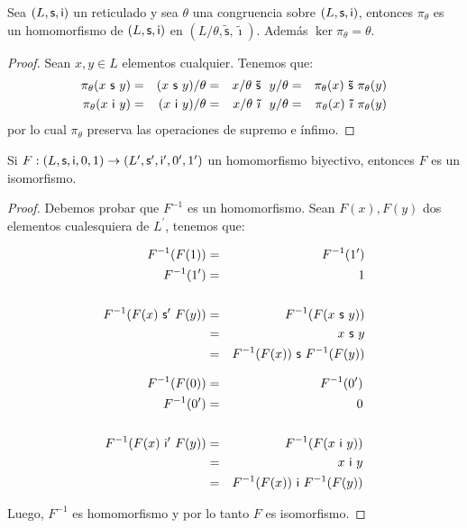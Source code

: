   \begin{lemma}
    \PN Sea $(L, \mathsf{s}, \mathsf{i})$ un reticulado y sea $\theta$ una congruencia sobre $(L, \mathsf{s}, \mathsf{i})$, entonces $\pi_{\theta}$
    es un homomorfismo de $(L, \mathsf{s}, \mathsf{i})$ en $(L/\theta, \mathsf{\tilde{s}}, \mathsf{\tilde{\imath}})$. Además $\ker
    \pi_{\theta} = \theta$.
  \end{lemma}
  \begin{proof}
    \PN Sean $x, y \in L$ elementos cualquier. Tenemos que:
      \begin{alignat*}{4}
        \pi_{\theta}(x \ \SU \ y) &=& (x \ \SU \ y)/\theta &=& x/\theta \ \mathsf{\tilde{s}} \ y/\theta &=&
          \pi_{\theta}(x) \ \mathsf{\tilde{s}} \ \pi_{\theta}(y) \\
        \pi_{\theta}(x \ \IN \ y) &=& (x \ \IN \ y)/\theta &=& x/\theta \ \mathsf{\tilde{\imath}} \ y/\theta &=&
          \pi_{\theta}(x) \ \mathsf{\tilde{\imath}} \ \pi_{\theta}(y) \\
      \end{alignat*}
    \PN por lo cual $\pi_{\theta}$ preserva las operaciones de supremo e ínfimo.
  \end{proof}

  \begin{lemma}
    \PN Si $F: (L, \mathsf{s}, \mathsf{i}, 0, 1) \rightarrow (L^{\prime}, \mathsf{s}^{\prime}, \mathsf{i}^{\prime}, 0^{\prime}, 1^{\prime})$ un
    homomorfismo biyectivo, entonces $F$ es un isomorfismo.
  \end{lemma}
  \begin{proof}
      \PN Debemos probar que $F^{-1}$ es un homomorfismo. Sean $F(x), F(y)$ dos elementos cualesquiera de $L^{\prime}$,
      tenemos que:
      \begin{multicols}{2}
        \begin{eqnarray*}
          F^{-1}(F(1)) &=& F^{-1}(1^{\prime}) \\
          F^{-1}(1^{\prime}) &=& 1 \\
          \\
          F^{-1}(F(x) \ \SU^{\prime} \ F(y)) &=& F^{-1}(F(x \ \SU \ y)) \\
          &=& x \ \SU \ y \\
          &=& F^{-1}(F(x)) \ \SU \ F^{-1}(F(y))
        \end{eqnarray*}

        \begin{eqnarray*}
          F^{-1}(F(0)) &=& F^{-1}(0^{\prime}) \\
          F^{-1}(0^{\prime}) &=& 0 \\
          \\
          F^{-1}(F(x) \ \IN^{\prime} \ F(y)) &=& F^{-1}(F(x \ \IN \ y)) \\
          &=& x \ \IN \ y \\
          &=& F^{-1}(F(x)) \ \IN \ F^{-1}(F(y))
        \end{eqnarray*}
      \end{multicols}

      \PN Luego, $F^{-1}$ es homomorfismo y por lo tanto $F$ es isomorfismo.
  \end{proof}

